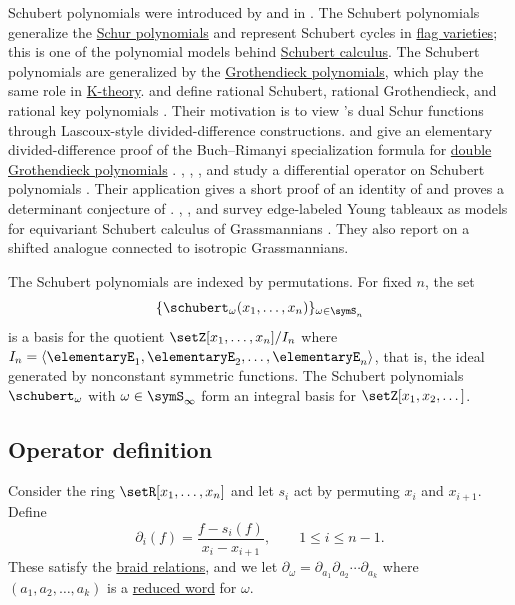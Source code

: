 Schubert polynomials were introduced by  and
in \cite{LascouxSchutzenberger1982}.
The Schubert polynomials generalize the \hyperref[schurS]{Schur polynomials} and
represent Schubert cycles in \hyperref[flagVarieties]{flag varieties}; this is
one of the polynomial models behind \hyperref[schubertCalculus]{Schubert calculus}.
The Schubert polynomials are generalized by the \hyperref[grothendieck]{Grothendieck polynomials},
which play the same role in \hyperref[kTheory]{K-theory}.
 and
 define rational Schubert, rational
Grothendieck, and rational key polynomials \cite{AkerTutas2015}.  Their
motivation is to view 's dual Schur functions through
Lascoux-style divided-difference constructions.
 and  give an elementary
divided-difference proof of the Buch--Rimanyi specialization formula for
\hyperref[grothendieckDouble]{double Grothendieck polynomials}
\cite{FanGuo2018x}.
, , , and
 study a differential operator on Schubert polynomials
\cite{HamakerPechenikSpeyerWeigandt2020}.  Their application gives a short
proof of an identity of  and proves a determinant
conjecture of .
, , and 
survey edge-labeled Young tableaux as models for equivariant Schubert
calculus of Grassmannians \cite{RobichauxYadavYong2022}.  They also report on
a shifted analogue connected to isotropic Grassmannians.

The Schubert polynomials are indexed by permutations.  For fixed $n$, the set
\[
\{ \schubert_\omega(x_1,\dotsc,x_n) \}_{\omega \in \symS_n}
\]
is a basis for the quotient $\setZ[x_1,\dotsc,x_n]/I_n$
where $I_n = \langle \elementaryE_1, \elementaryE_2,\dotsc, \elementaryE_n \rangle$,
that is, the ideal generated by nonconstant symmetric functions.
The Schubert polynomials $\schubert_\omega$ with $\omega \in \symS_\infty$
form an integral basis for $\setZ[x_1,x_2,\dotsc]$.


\subsection[schubertOperatorformula]{Operator definition}

Consider the ring $\setR[x_1,\dotsc,x_n]$ and let $s_i$ act by permuting
$x_i$ and $x_{i+1}$.
Define
\[
  \partial_i(f)=\frac{f-s_i(f)}{x_i-x_{i+1}},
  \qquad 1 \leq i \leq n-1.
\]
These \label{dividedDifferenceOperators}
satisfy the
\hyperref[braidRelations]{braid relations},
and we let $\partial_\omega = \partial_{a_1} \partial_{a_2} \dotsm \partial_{a_k}$
where $(a_1,a_2,\dotsc,a_k)$ is a \hyperref[reducedWord]{reduced word} for $\omega$.

